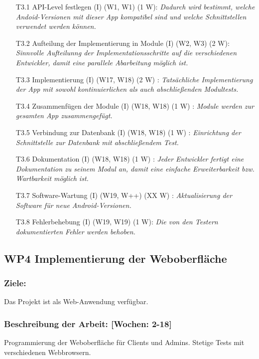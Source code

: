 \documentclass{scrreprt}
\begin{document}
\begin{enumerate}
\item [T3.1] API-Level festlegen (I) (W1, W1) (1 W): \emph{ Dadurch wird bestimmt, welche Andoid-Versionen mit dieser App kompatibel sind und welche Schnittstellen verwendet werden können.}
\item [T3.2] Aufteilung der Implementierung in Module (I) (W2, W3) (2 W): \emph{ Sinnvolle Aufteilunng der Implementationsschritte auf die verschiedenen Entwickler, damit eine parallele Abarbeitung möglich ist.}
\item [T3.3] Implementierung (I) (W17, W18) (2 W) : \emph{ Tatsächliche Implementierung der App mit sowohl kontinuierlichen als auch abschließenden Modultests.}
\item [T3.4] Zusammenfügen der Module (I) (W18, W18) (1 W) : \emph{ Module werden zur gesamten App zusammengefügt.}
\item [T3.5] Verbindung zur Datenbank (I) (W18, W18) (1 W) : \emph{ Einrichtung der Schnittstelle zur Datenbank mit abschließendem Test.}
\item [T3.6] Dokumentation (I) (W18, W18) (1 W) : \emph{ Jeder Entwickler fertigt eine Dokumentation zu seinem Modul an, damit eine einfache Erweiterbarkeit bzw. Wartbarkeit möglich ist.}
\item [T3.7] Software-Wartung (I) (W19, W++) (XX W) : \emph{ Aktualisierung der Software für neue Android-Versionen.}
\item [T3.8] Fehlerbehebung (I) (W19, W19) (1 W): \emph{Die von den Testern dokumentierten Fehler werden behoben.}
\end{enumerate}

\subsection*{WP4 Implementierung der Weboberfläche}

\subsubsection{Ziele:} Das Projekt ist als Web-Anwendung verfügbar.
\subsubsection{Beschreibung der Arbeit: [Wochen: 2-18]} Programmierung der Weboberfläche für Clients und Admins. Stetige Tests mit verschiedenen Webbrowsern.
\end{document}
